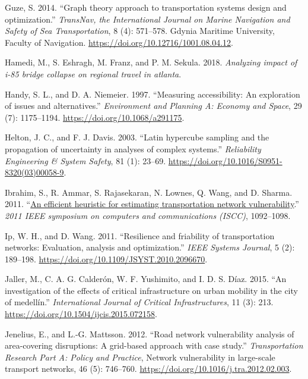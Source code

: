 \documentclass[]{ascelike-new}
\newlength{\cslhangindent}
\newenvironment{CSLReferences}[2] %
 {\begin{list}{}{%
  \setlength{\itemindent}{0pt}
  \setlength{\leftmargin}{0pt}
  \setlength{\parsep}{0pt}
  \ifodd #1
   \setlength{\leftmargin}{\cslhangindent}
   \setlength{\itemindent}{-1\cslhangindent}
  \fi
  \setlength{\itemsep}{#2\baselineskip}}}
 {\end{list}}
\begin{document}
\begin{CSLReferences}{1}{0}
Guze, S. 2014. {``Graph theory approach to transportation systems design
and optimization.''} \emph{TransNav, the International Journal on Marine
Navigation and Safety of Sea Transportation}, 8 (4): 571--578. Gdynia
Maritime University, Faculty of Navigation.
\url{https://doi.org/10.12716/1001.08.04.12}.

Hamedi, M., S. Eshragh, M. Franz, and P. M. Sekula. 2018.
\emph{Analyzing impact of i-85 bridge collapse on regional travel in
atlanta}.

Handy, S. L., and D. A. Niemeier. 1997. {``Measuring accessibility: An
exploration of issues and alternatives.''} \emph{Environment and
Planning A: Economy and Space}, 29 (7): 1175--1194.
\url{https://doi.org/10.1068/a291175}.

Helton, J. C., and F. J. Davis. 2003. {``Latin hypercube sampling and
the propagation of uncertainty in analyses of complex systems.''}
\emph{Reliability Engineering \& System Safety}, 81 (1): 23--69.
\url{https://doi.org/10.1016/S0951-8320(03)00058-9}.

Ibrahim, S., R. Ammar, S. Rajasekaran, N. Lownes, Q. Wang, and D.
Sharma. 2011. {``\href{https://doi.org/10.1109/ISCC.2011.5983988}{An
efficient heuristic for estimating transportation network
vulnerability}.''} \emph{2011 IEEE symposium on computers and
communications (ISCC)}, 1092--1098.

Ip, W. H., and D. Wang. 2011. {``Resilience and friability of
transportation networks: Evaluation, analysis and optimization.''}
\emph{IEEE Systems Journal}, 5 (2): 189--198.
\url{https://doi.org/10.1109/JSYST.2010.2096670}.

Jaller, M., C. A. G. Calderón, W. F. Yushimito, and I. D. S. Díaz. 2015.
{``An investigation of the effects of critical infrastructure on urban
mobility in the city of medellín.''} \emph{International Journal of
Critical Infrastructures}, 11 (3): 213.
\url{https://doi.org/10.1504/ijcis.2015.072158}.

Jenelius, E., and L.-G. Mattsson. 2012. {``Road network vulnerability
analysis of area-covering disruptions: A grid-based approach with case
study.''} \emph{Transportation Research Part A: Policy and Practice},
Network vulnerability in large-scale transport networks, 46 (5):
746--760. \url{https://doi.org/10.1016/j.tra.2012.02.003}.


\end{CSLReferences}
\end{document}
